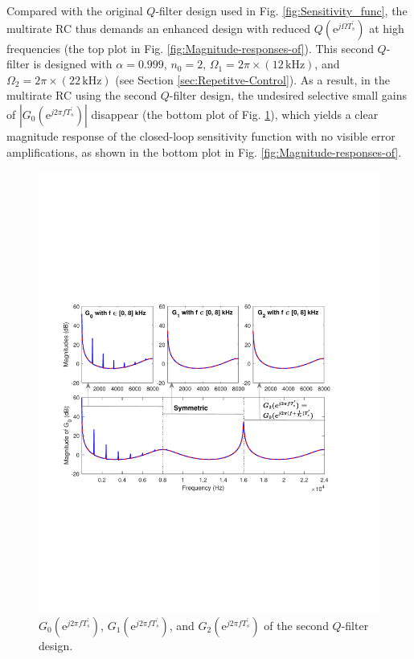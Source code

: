 \documentclass [11pt, proquest] {uwthesis}[2020/02/24]
\begin{document}
Compared with the original $Q$-filter design used in Fig. \ref{fig:Sensitivity_func},
the multirate RC thus demands an enhanced design with reduced $Q(\text{e}^{j\Omega T_{s}^{'}})$
at high frequencies (the top plot in Fig. \ref{fig:Magnitude-responses-of}).
This second $Q$-filter is designed with $\alpha=0.999$, $n_{0}=2$,
$\Omega_{1}=2\pi\times(12\,\text{kHz})$, and $\Omega_{2}=2\pi\times(22\,\text{kHz})$
(see Section \ref{sec:Repetitve-Control}). As a result, in the multirate
RC using the second $Q$-filter design, the undesired selective small
gains of $|G_{0}(\text{e}^{j2\pi fT_{s}^{'}})|$ disappear (the bottom
plot of Fig. \ref{fig:The-relationship-between-2}), which yields
a clear magnitude response of the closed-loop sensitivity function
with no visible error amplifications, as shown in the bottom plot
in Fig. \ref{fig:Magnitude-responses-of}.
\begin{figure}[!ht]
\begin{centering}
\includegraphics[width=13cm]{Fractional-order-RC/G_all_another_Q}
\par\end{centering}
\caption{\label{fig:The-relationship-between-2}$G_{0}(\text{e}^{j2\pi fT_{s}^{'}})$,
$G_{1}(\text{e}^{j2\pi fT_{s}^{'}})$, and $G_{2}(\text{e}^{j2\pi fT_{s}^{'}})$
of the second $Q$-filter design.}
\end{figure}
\end{document}
